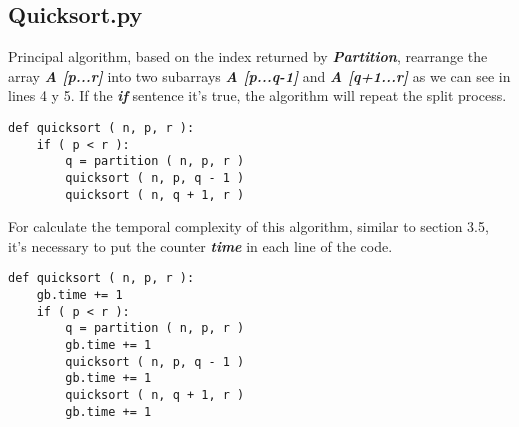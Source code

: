 \subsection{Quicksort.py}

Principal algorithm, based on the index returned by {\bfseries\itshape Partition}, rearrange the array {\bfseries\itshape A [p...r]} into two subarrays {\bfseries\itshape A [p...q-1]} and {\bfseries\itshape A [q+1...r]} as we can see in lines 4 y 5. If the {\bfseries\itshape if} sentence it's true, the algorithm will repeat the split process. \hfill \break 

\begin{lstlisting}
def quicksort ( n, p, r ):
    if ( p < r ):
        q = partition ( n, p, r )
        quicksort ( n, p, q - 1 )
        quicksort ( n, q + 1, r )
\end{lstlisting} \hfill

For calculate the temporal complexity of this algorithm, similar to section 3.5, it's necessary to put the counter {\bfseries\itshape time} in each line of the code. \hfill \break

\begin{lstlisting}
def quicksort ( n, p, r ):
    gb.time += 1
    if ( p < r ):
        q = partition ( n, p, r )
        gb.time += 1
        quicksort ( n, p, q - 1 )
        gb.time += 1
        quicksort ( n, q + 1, r )
        gb.time += 1
\end{lstlisting} \hfill

\pagebreak